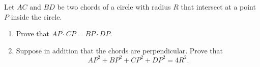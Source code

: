 Let $AC$ and $BD$ be two chords of a circle with radius $R$ that intersect at a point $P$ inside the circle.
\begin{enumerate}
\item[(a)] Prove that $AP\cdot CP=BP\cdot DP$.
\item[(b)] Suppose in addition that the chords are perpendicular. Prove that
\[AP^2+BP^2+CP^2+DP^2=4R^2.\]
\end{enumerate}
